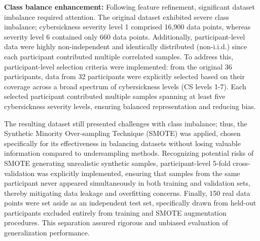 \documentclass{vgtc}                          %
\begin{document}
\noindent\textbf{Class balance enhancement:} Following feature refinement, significant dataset imbalance required attention. The original dataset exhibited severe class imbalance; cybersickness severity level 1 comprised 16,900 data points, whereas severity level 6 contained only 660 data points. Additionally, participant-level data were highly non-independent and identically distributed (non-i.i.d.) since each participant contributed multiple correlated samples. To address this, participant-level selection criteria were implemented: from the original 36 participants, data from 32 participants were explicitly selected based on their coverage across a broad spectrum of cybersickness levels (CS levels 1-7). Each selected participant contributed multiple samples spanning at least five cybersickness severity levels, ensuring balanced representation and reducing bias.

The resulting dataset still presented challenges with class imbalance; thus, the Synthetic Minority Over-sampling Technique (SMOTE) \cite{Chawla_2002} was applied, chosen specifically for its effectiveness in balancing datasets without losing valuable information compared to undersampling methods. Recognizing potential risks of SMOTE generating unrealistic synthetic samples, participant-level 5-fold cross-validation was explicitly implemented, ensuring that samples from the same participant never appeared simultaneously in both training and validation sets, thereby mitigating data leakage and overfitting concerns. Finally, 150 real data points were set aside as an independent test set, specifically drawn from held-out participants excluded entirely from training and SMOTE augmentation procedures. This separation assured rigorous and unbiased evaluation of generalization performance.




\end{document}
